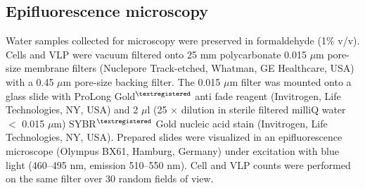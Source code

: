 \subsection{Epifluorescence microscopy}
Water samples collected for microscopy were preserved in formaldehyde (1\% v/v). 
Cells and \acs{VLP} were vacuum filtered onto 25 mm polycarbonate 0.015 $\mu$m pore-size membrane filters (Nuclepore Track-etched, Whatman, GE Healthcare, USA) with a 0.45 $\mu$m pore-size backing filter. 
The 0.015 $\mu$m filter was mounted onto a glass slide with ProLong Gold$^{\textregistered}$ anti fade reagent (Invitrogen, Life Technologies, NY, USA) and 2 $\mu$l (25 × dilution in sterile filtered milliQ water $<$ 0.015 $\mu$m) SYBR$^{\textregistered}$ Gold nucleic acid stain (Invitrogen, Life Technologies, NY, USA). 
Prepared slides were visualized in an epifluorescence microscope (Olympus BX61, Hamburg, Germany) under excitation with blue light (460–495 nm, emission 510–550 nm). 
Cell and \ac{VLP} counts were performed on the same filter over 30 random fields of view.

